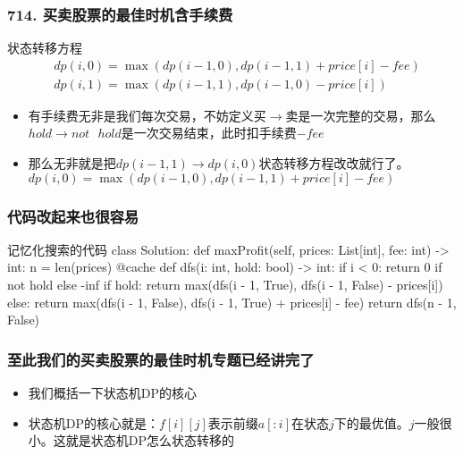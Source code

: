 \begin{frame}[fragile]          %
  \frametitle{\textsc{714. 买卖股票的最佳时机含手续费}}
    \begin{alertblock}{状态转移方程}
    \begin{align}
      &dp(i,0)=\max(dp(i-1,0),dp(i-1,1)+price[i]-fee)\\
      &dp(i,1)=\max(dp(i-1,1),dp(i-1,0)-price[i])
    \end{align}
  \end{alertblock}
  \begin{itemize}
    \item 有手续费无非是我们每次交易，不妨定义买$\to$卖是一次完整的交易，那么$hold \to not \text{ } hold$是一次交易结束，此时扣手续费$-fee$
    \item 那么无非就是把$dp(i-1,1)\to dp(i,0)$状态转移方程改改就行了。$dp(i,0)=\max(dp(i-1,0),dp(i-1,1)+price[i]-fee)$
  \end{itemize}
\end{frame}


\begin{frame}[fragile]
  \frametitle{代码改起来也很容易}
  \begin{codeblock}[language=python]{记忆化搜索的代码}
class Solution:
    def maxProfit(self, prices: List[int], fee: int) -> int:
        n = len(prices)
        @cache
        def dfs(i: int, hold: bool) -> int:
            if i < 0:
                return 0 if not hold else -inf
            if hold:
                return max(dfs(i - 1, True), dfs(i - 1, False) - prices[i])
            else:
                return max(dfs(i - 1, False), dfs(i - 1, True) + prices[i] - fee)
        return dfs(n - 1, False)
  \end{codeblock}
\end{frame}



\begin{frame}[fragile]          %
  \frametitle{至此我们的买卖股票的最佳时机专题已经讲完了}
  \begin{itemize}
    \item 我们概括一下状态机\textsc{DP}的核心
    \item 状态机\textsc{DP}的核心就是：$f[i][j]$表示前缀$a[:i]$在状态$j$下的最优值。$j$一般很小。这就是状态机\textsc{DP}怎么状态转移的
  \end{itemize}
\end{frame}



